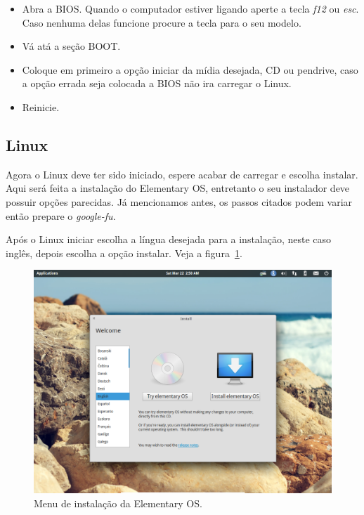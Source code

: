 \documentclass{handout_utfpr}
\begin{document}
\begin{itemize}\label{itm:boot-order}
    \item Abra a BIOS\@. Quando o computador estiver ligando aperte a tecla \emph{f12} ou \emph{esc}. Caso nenhuma delas funcione procure a tecla para o seu modelo.
    \item Vá atá a seção BOOT.
    \item Coloque em primeiro a opção iniciar da mídia desejada, CD ou pendrive, caso a opção errada seja colocada a BIOS não ira carregar o Linux.
    \item Reinicie.
\end{itemize}

\subsection{Linux}

Agora o Linux deve ter sido iniciado, espere acabar de carregar e escolha instalar. Aqui será feita a instalação do Elementary OS, entretanto o seu instalador deve possuir opções parecidas. Já mencionamos antes, os passos citados podem variar então prepare o \emph{google-fu}.

Após o Linux iniciar escolha a língua desejada para a instalação, neste caso inglês, depois escolha a opção instalar. Veja a figura~\ref{fig:elementary-menu}.

\begin{figure}[H]
  \centering
  \includegraphics[scale=.3]{imagens/elementary-install-01.png}
  \caption{Menu de instalação da Elementary OS\@.}
  \label{fig:elementary-menu}
\end{figure}
\end{document}
